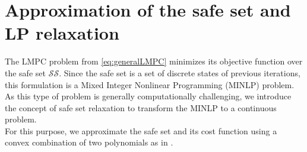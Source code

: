 \section{Approximation of the safe set and LP relaxation}
The LMPC problem from \eqref{eq:generalLMPC} minimizes its objective function over the safe set $\mathcal{SS}$. Since the safe set is a set of discrete states of previous iterations, this formulation is a Mixed Integer Nonlinear Programming (MINLP) problem. As this type of problem is generally computationally challenging, we introduce the concept of safe set relaxation to transform the MINLP to a continuous problem.\\
For this purpose, we approximate the safe set and its cost function using a convex combination of two polynomials as in \cite{RosoliaRacing}.

